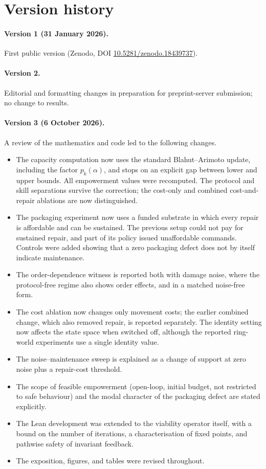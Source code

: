 \section{Version history}
\label{app:versions}

\paragraph{Version 1 (31 January 2026).}
First public version (Zenodo, DOI \href{https://doi.org/10.5281/zenodo.18439737}{10.5281/zenodo.18439737}).

\paragraph{Version 2.}
Editorial and formatting changes in preparation for preprint-server submission; no change to results.

\paragraph{Version 3 (6 October 2026).}
A review of the mathematics and code led to the following changes.
\begin{itemize}[leftmargin=*, itemsep=0.2em]
  \item The capacity computation now uses the standard Blahut--Arimoto update, including the factor $p_k(\alpha)$, and stops on an explicit gap between lower and upper bounds. All empowerment values were recomputed. The protocol and skill separations survive the correction; the cost-only and combined cost-and-repair ablations are now distinguished.
  \item The packaging experiment now uses a funded substrate in which every repair is affordable and can be sustained. The previous setup could not pay for sustained repair, and part of its policy issued unaffordable commands. Controls were added showing that a zero packaging defect does not by itself indicate maintenance.
  \item The order-dependence witness is reported both with damage noise, where the protocol-free regime also shows order effects, and in a matched noise-free form.
  \item The cost ablation now changes only movement costs; the earlier combined change, which also removed repair, is reported separately. The identity setting now affects the state space when switched off, although the reported ring-world experiments use a single identity value.
  \item The noise--maintenance sweep is explained as a change of support at zero noise plus a repair-cost threshold.
  \item The scope of feasible empowerment (open-loop, initial budget, not restricted to safe behaviour) and the modal character of the packaging defect are stated explicitly.
  \item The Lean development was extended to the viability operator itself, with a bound on the number of iterations, a characterisation of fixed points, and pathwise safety of invariant feedback.
  \item The exposition, figures, and tables were revised throughout.
\end{itemize}
